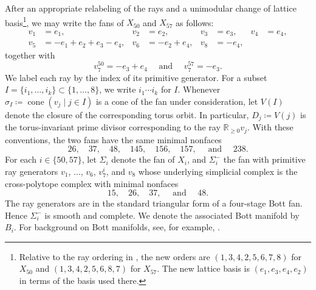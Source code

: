 \documentclass[10pt,a4paper]{amsart}
\numberwithin{equation}{section}
\newcommand{\R}{\mathbb R}
\newcommand{\wideand}{ \quad \text{ and } \quad }
\DeclareMathOperator{\cone}{cone}
\begin{document}
After an appropriate relabeling of the rays and a unimodular change of lattice basis\footnote{Relative to the ray ordering in \cite[Table~27]{Higashitani-Kurimoto-Masuda2022}, the new orders are $(1,3,4,2,5,6,7,8)$ for $X_{50}$ and $(1,3,4,2,5,6,8,7)$ for $X_{57}$. The new lattice basis is $(e_1,e_3,e_4,e_2)$ in terms of the basis used there.}, we may write the fans of $X_{50}$ and $X_{57}$ as follows:
\begin{align*}
    v_1&=e_1,& v_2&=e_2,& v_3&=e_3,& v_4&=e_4,\\
    v_5&=-e_1+e_2+e_3-e_4,& v_6&=-e_2+e_4,& v_8&=-e_4,
\end{align*}
together with
$$
    v_7^{50}=-e_3+e_4 \wideand v_7^{57}=-e_3.
$$
We label each ray by the index of its primitive generator. 
For a subset $I=\{i_1,\ldots,i_k\}\subset \{1,\ldots,8\}$, we write $i_1\cdots i_k$ for $I$. 
Whenever $\sigma_I \coloneq \cone(v_j\mid j\in I)$ is a cone of the fan under consideration, let $V(I)$ denote the closure of the corresponding torus orbit. 
In particular, $D_j \coloneq V(j)$ is the torus-invariant prime divisor corresponding to the ray $\R_{\geq 0}v_j$.
With these conventions, the two fans have the same minimal nonfaces
$$
    26,\quad 37,\quad 48,\quad 145,\quad 156,\quad 157, \wideand 238.
$$
For each $i\in\{50,57\}$, let $\Sigma_i$ denote the fan of $X_i$, and $\Sigma_i^-$ the fan with primitive ray generators $v_1$, $\ldots$, $v_6$, $v_7^i$, and $v_8$ whose underlying simplicial complex is the cross-polytope complex with minimal nonfaces
\begin{equation}\label{eq:B-mnf}
    15,\quad 26,\quad 37, \wideand 48.
\end{equation}
The ray generators are in the standard triangular form of a four-stage Bott fan. 
Hence $\Sigma_i^-$ is smooth and complete. 
We denote the associated Bott manifold by~$B_i$.
For background on Bott manifolds, see, for example, \cite{Grossberg-Karshon1994, Masuda-Panov2008,Choi-Hwang-Jang2025}.
\end{document}
